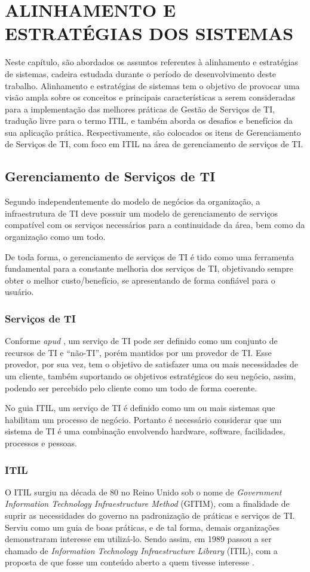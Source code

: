 \section{ALINHAMENTO E ESTRATÉGIAS DOS SISTEMAS}\label{sec:rw}
Neste capítulo, são abordados os assuntos referentes à alinhamento e estratégias de sistemas, cadeira estudada durante o período de desenvolvimento deste trabalho. Alinhamento e estratégias de sistemas tem o objetivo de provocar uma visão ampla sobre os conceitos e principais características a serem consideradas para a implementação das melhores práticas de Gestão de Serviços de TI, tradução livre para o termo ITIL, e também aborda os desafios e benefícios da sua aplicação prática. Respectivamente, são colocados os itens de Gerenciamento de Serviços de TI, com foco em ITIL na área de gerenciamento de serviços de TI.

\subsection{Gerenciamento de Serviços de TI}
Segundo \cite{gerenciamentoti_itil_magalhaes_pinheiro} independentemente do modelo de negócios da organização, a infraestrutura de TI deve possuir um modelo de gerenciamento de serviços compatível com os serviços necessários para a continuidade da área, bem como da organização como um todo.

De toda forma, o gerenciamento de serviços de TI é tido como uma ferramenta fundamental para a constante melhoria dos serviços de TI, objetivando sempre obter o melhor custo/benefício, se apresentando de forma confiável para o usuário.
\subsubsection{Serviços de TI}
Conforme \cite{mildner_2009} \textit{apud} \cite{gerenciamentoti_itil_magalhaes_pinheiro}, um serviço de TI pode ser definido como um conjunto de recursos de TI e “não-TI”, porém mantidos por um provedor de TI. Esse provedor, por sua vez, tem o objetivo de satisfazer uma ou mais necessidades de um cliente, também suportando os objetivos estratégicos do seu negócio, assim, podendo ser percebido pelo cliente como um todo de forma coerente.
    
No guia ITIL, um serviço de TI é definido como um ou mais sistemas que habilitam um processo de negócio. Portanto é necessário considerar que um sistema de TI é uma combinação envolvendo hardware, software, facilidades, processos e pessoas.
\subsubsection{ITIL}
O ITIL surgiu na década de 80 no Reino Unido sob o nome de \textit{Government Information Technology Infraestructure Method} (GITIM), com a finalidade de suprir as necessidades do governo na padronização de práticas e serviços de TI. Serviu como um guia de boas práticas, e de tal forma, demais organizações demonstraram interesse em utilizá-lo. Sendo assim, em 1989 passou a ser chamado de \textit{Information Technology Infraestructure Library} (ITIL), com a proposta de que fosse um conteúdo aberto a quem tivesse interesse \citep{freitas_2013}.

